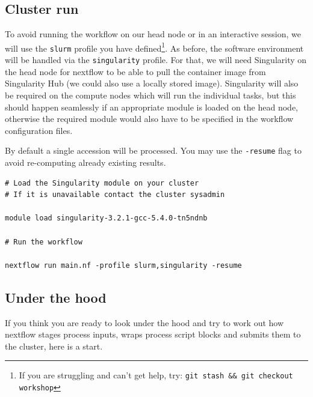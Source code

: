 \subsection{Cluster run}


To avoid running the workflow on our head node or in an interactive session, we will use the \texttt{slurm} profile you have defined\footnote{If you are struggling and can't get help, try: \texttt{git stash \&\& git checkout workshop}}. 
As before, the software environment will be handled via the \texttt{singularity} profile. 
For that, we will need Singularity on the head node for nextflow to be able to pull the container image from Singularity Hub (we could also use a locally stored image). Singularity will also be required on the compute nodes which will run the individual tasks, but this should happen seamlessly if an appropriate module is loaded on the head node, otherwise the required module would also have to be specified in the workflow configuration files. 

\begin{steps}
By default a single accession will be processed. 
You may use the \texttt{-resume} flag to avoid re-computing already existing results. 


\begin{lstlisting}
# Load the Singularity module on your cluster
# If it is unavailable contact the cluster sysadmin

module load singularity-3.2.1-gcc-5.4.0-tn5ndnb

# Run the workflow

nextflow run main.nf -profile slurm,singularity -resume
\end{lstlisting}
\end{steps}



\subsection{Under the hood}

If you think you are ready to look under the hood and try to work out how nextflow stages process inputs, wraps process script blocks and submits them to the cluster, here is a start. 

